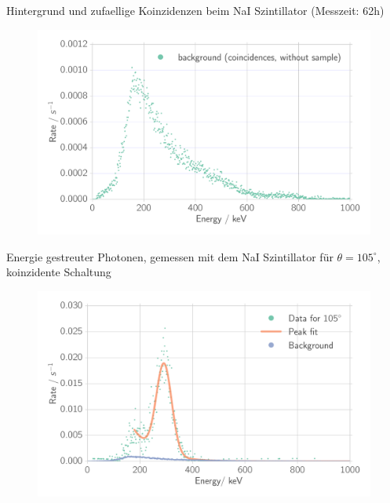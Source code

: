 \documentclass[xcolor=x11names,compress]{beamer}
\renewcommand{\(}{\begin{columns}}
\renewcommand{\)}{\end{columns}}
\newcommand{\<}[1]{\begin{column}{#1}}
\renewcommand{\>}{\end{column}}
\begin{document}
\begin{frame}[t]{Hintergrund und zufaellige Koinzidenzen beim 
        NaI Szintillator (Messzeit: 62h)}
\begin{figure}[htpb]
    \centering
    \includegraphics[width=1.0\linewidth]{../analysis/figures/coin_na_background}
\end{figure}
\end{frame}

\begin{frame}[t]{Energie gestreuter Photonen, gemessen mit dem NaI Szintillator für 
    $\theta = 105^\circ$, koinzidente Schaltung}
\begin{figure}[htpb]
    \centering
    \includegraphics[width=1.0\linewidth]{../analysis/figures/coin_na_105}
    \label{fig:coin_na_30}
\end{figure}
\end{frame}
\end{document}
